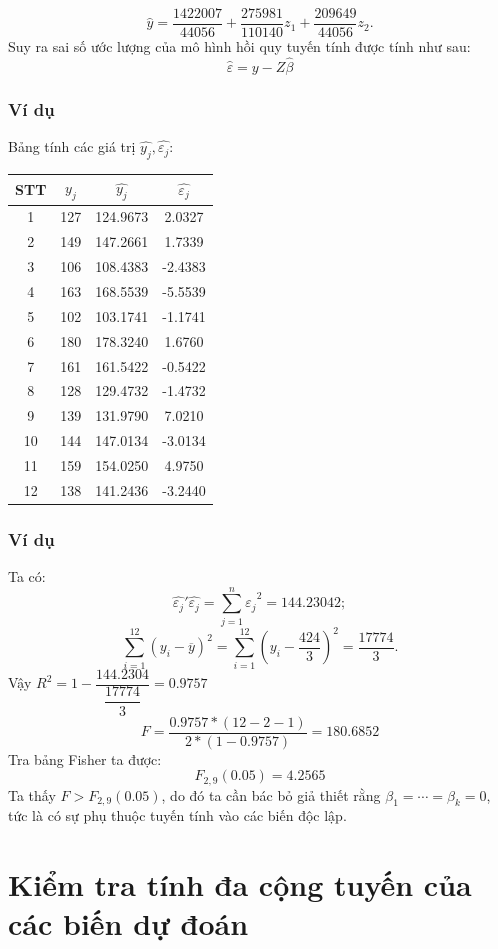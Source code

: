\begin{footnotesize}
\begin{frame}
 \[
 \widehat{y} = \dfrac{1422007}{44056} + \dfrac{275981}{110140}z_1 + \dfrac{209649}{44056}z_2.
 \]
 Suy ra sai số ước lượng của mô hình hồi quy tuyến tính được tính như sau: 
 \[
 \widehat{\varepsilon} = y - Z\widehat{\beta}
 \]
\end{frame}
\begin{frame}
\frametitle{Ví dụ}
Bảng tính các giá trị $\widehat{y_j}, \widehat{\varepsilon_j}$: 
\begin{center}
    \begin{tabular}{|c|c|c|c|}
    \hline 
    STT & $y_j$ & $\widehat{y_j}$ & $\widehat{\varepsilon_j}$ \\
    \hline 
    1  & 127 & 124.9673 & 2.0327 \\
    2  & 149 & 147.2661 & 1.7339 \\
    3  & 106 & 108.4383 & -2.4383 \\
    4  & 163 & 168.5539 & -5.5539 \\
    5  & 102 & 103.1741 & -1.1741 \\
    6  & 180 & 178.3240 & 1.6760 \\
    7  & 161 & 161.5422 & -0.5422 \\
    8  & 128 & 129.4732 & -1.4732 \\
    9  & 139 & 131.9790 & 7.0210 \\
    10 & 144 & 147.0134 & -3.0134 \\
    11 & 159 & 154.0250 & 4.9750 \\
    12 & 138 & 141.2436 & -3.2440 \\
    \hline
\end{tabular}
\end{center}
\end{frame}
\begin{frame}
\frametitle{Ví dụ}
Ta có:
\[\widehat{\varepsilon_j}'\widehat{\varepsilon_j}=\sum\limits_{j = 1}^n{\widehat{\varepsilon_j}^2} = 144.23042;
\]
\[
\sum_{i=1}^{12}(y_i - \overline{y})^2 =  \sum_{i=1}^{12}\left(y_i - \dfrac{424}{3}\right)^2 = \dfrac{17774}{3}.
\] 
Vậy $R^2 = 1 - \dfrac{144.2304}{\dfrac{17774}{3}} = 0.9757$
$$F = \dfrac{0.9757 * (12-2-1)}{2*(1-0.9757)} = 180.6852$$
Tra bảng Fisher ta được: $$F_{2,9}(0.05)=4.2565$$
Ta thấy $F > F_{2,9}(0.05)$, do đó ta cần bác bỏ giả thiết rằng $\beta_1 = \cdots = \beta_k = 0$, tức là có sự phụ thuộc tuyến tính vào các biến độc lập.
\end{frame}
\section{Kiểm tra tính đa cộng tuyến của các biến dự đoán}

\end{footnotesize}
